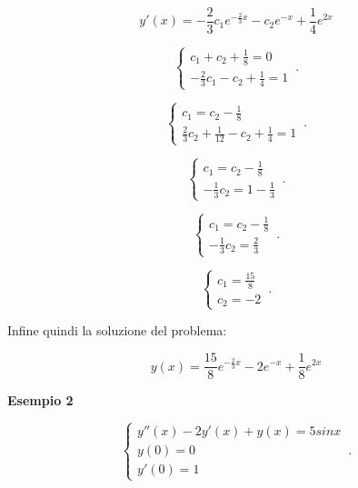 \documentclass[11pt]{article}
\begin{document}
\[
    y'(x) = -\frac{2}{3}c_1 e ^{-\frac{2}{3}x} - c_2 e ^{-x}+ \frac{1}{4} e ^{2x}
\]


    \begin{equation}
        \begin{cases}
            c_1+c_2+\frac{1}{8}=0\\
            -\frac{2}{3}c_1-c_2+\frac{1}{4}=1
        \end{cases}\,.
    \end{equation}

    \begin{equation}
        \begin{cases}
            c_1=c_2-\frac{1}{8}\\
            \frac{2}{3}c_2+\frac{1}{12}-c_2+\frac{1}{4}=1
        \end{cases}\,.
    \end{equation}


    \begin{equation}
        \begin{cases}
            c_1=c_2-\frac{1}{8}\\
            -\frac{1}{3}c_2= 1- \frac{1}{3}
        \end{cases}\,.
    \end{equation}

    \begin{equation}
        \begin{cases}
            c_1=c_2-\frac{1}{8}\\
            -\frac{1}{3}c_2=\frac{2}{3}
        \end{cases}\,.
    \end{equation}

    \begin{equation}
        \begin{cases}
            c_1=\frac{15}{8}\\
            c_2=-2
        \end{cases}\,.
    \end{equation}


Infine quindi la soluzione del problema:

\[
    y(x) = \frac{15}{8}e ^{-\frac{2}{3}x}- 2 e ^{-x}+ \frac{1}{8}e ^{2x}
\]


\textbf{Esempio 2} 

    \begin{equation}
        \begin{cases}
    y''(x) -2y'(x)+ y(x) = 5sinx \\
            y(0) = 0\\
            y'(0) = 1
        \end{cases}\,.
    \end{equation}
\end{document}
